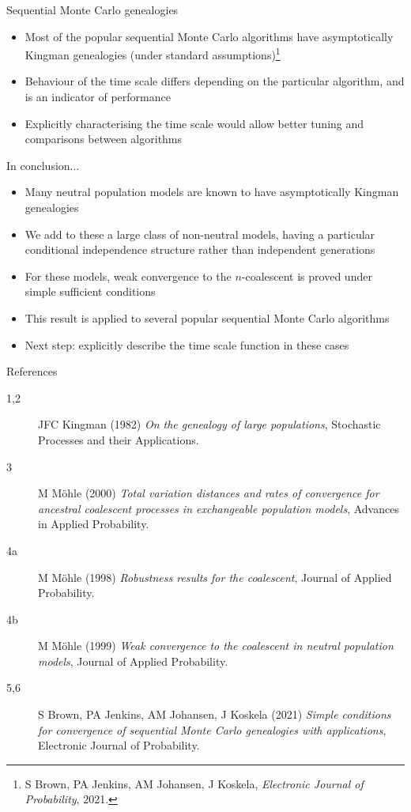 \documentclass[aspectratio=169,fleqn]{beamer}
\theoremstyle{definition}
\begin{document}
\begin{frame}{Sequential Monte Carlo genealogies}
	\begin{itemize}
	\item Most of the popular sequential Monte Carlo algorithms have asymptotically Kingman genealogies (under standard assumptions)\footnote{S Brown, PA Jenkins, AM Johansen, J Koskela, \textit{Electronic Journal of Probability}, 2021.}
	\item Behaviour of the time scale differs depending on the particular algorithm, and is an indicator of performance 
	\item Explicitly characterising the time scale would allow better tuning and comparisons between algorithms
	\end{itemize}
\end{frame}


\begin{frame}{In conclusion...}
\begin{itemize}
\item Many neutral population models are known to have asymptotically Kingman genealogies
\item We add to these a large class of non-neutral models, having a particular conditional independence structure rather than independent generations
\item For these models, weak convergence to the $n$-coalescent is proved under simple sufficient conditions
\item This result is applied to several popular sequential Monte Carlo algorithms
\item Next step: explicitly describe the time scale function in these cases
\end{itemize}
\end{frame}


\begin{frame}{References}
\begin{description}
\item [1,2] JFC Kingman (1982) \textit{On the genealogy of large populations}, Stochastic Processes and their Applications.
\item [3] M M\"ohle (2000) \textit{Total variation distances and rates of convergence for ancestral coalescent processes in exchangeable population models}, Advances in Applied Probability.
\item [4a] M M\"ohle (1998) \textit{Robustness results for the coalescent}, Journal of Applied Probability.
\item [4b] M M\"ohle (1999) \textit{Weak convergence to the coalescent in neutral population models}, Journal of Applied Probability.
\item [5,6] S Brown, PA Jenkins, AM Johansen, J Koskela (2021) \textit{Simple conditions for convergence of sequential Monte Carlo genealogies with applications}, Electronic Journal of Probability.
\end{description}
\end{frame}
\end{document}
